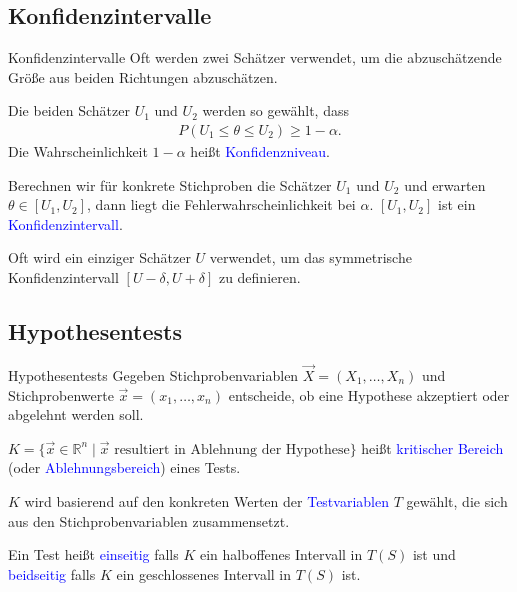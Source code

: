 \documentclass{beamer}
\def\padding{\vspace{0.5cm}}
\def\spadding{\vspace{0.25cm}}
\def\b{\textcolor{blue}}
\begin{document}
\subsection{Konfidenzintervalle}
\begin{frame}{Konfidenzintervalle}
    Oft werden zwei Schätzer verwendet, um die abzuschätzende Größe aus beiden Richtungen abzuschätzen.\pause\par
    Die beiden Schätzer $U_1$ und $U_2$ werden so gewählt, dass
    \begin{align*}
        P(U_1 \leq \theta \leq U_2) \geq 1 - \alpha.
    \end{align*}\pause
    Die Wahrscheinlichkeit $1 - \alpha$ heißt \b{Konfidenzniveau}.\pause\par\padding
    Berechnen wir für konkrete Stichproben die Schätzer $U_1$ und $U_2$ und erwarten $\theta \in [U_1, U_2]$, dann liegt die Fehlerwahrscheinlichkeit bei $\alpha$. $[U_1, U_2]$ ist ein \b{Konfidenzintervall}.\pause\par\spadding
    Oft wird ein einziger Schätzer $U$ verwendet, um das symmetrische Konfidenzintervall $[U - \delta, U + \delta]$ zu definieren.
\end{frame}

\subsection{Hypothesentests}
\begin{frame}{Hypothesentests}
    Gegeben Stichprobenvariablen $\overrightarrow{X} = (X_1, \dots, X_n)$ und Stichprobenwerte $\overrightarrow{x} = (x_1, \dots, x_n)$ entscheide, ob eine Hypothese akzeptiert oder abgelehnt werden soll.\pause\par\padding
    $K = \{\overrightarrow{x} \in \mathbb{R}^n \mid \overrightarrow{x} \text{ resultiert in Ablehnung der Hypothese}\}$ heißt \b{kritischer Bereich} (oder \b{Ablehnungsbereich}) eines Tests.\pause\par\padding
    $K$ wird basierend auf den konkreten Werten der \b{Testvariablen} $T$ gewählt, die sich aus den Stichprobenvariablen zusammensetzt.\pause\par\padding
    Ein Test heißt \b{einseitig} falls $K$ ein halboffenes Intervall in $T(S)$ ist und \b{beidseitig} falls $K$ ein geschlossenes Intervall in $T(S)$ ist.
\end{frame}
\end{document}
